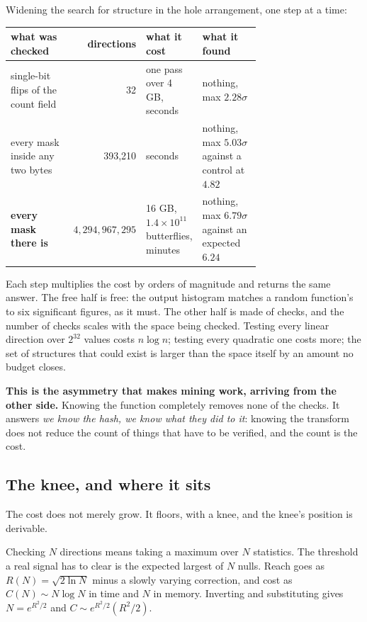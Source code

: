 Widening the search for structure in the hole arrangement, one step at a time:

\begin{center}
\begin{tabular}{@{}p{0.26\linewidth}rp{0.2\linewidth}p{0.24\linewidth}@{}}
\toprule
what was checked & directions & what it cost & what it found \\
\midrule
single-bit flips of the count field & 32 & one pass over 4 GB, seconds & nothing, max \(2.28\sigma\) \\
every mask inside any two bytes & 393,210 & seconds & nothing, max \(5.03\sigma\) against a control at \(4.82\) \\
\textbf{every mask there is} & \(4{,}294{,}967{,}295\) & 16 GB, \(1.4\times10^{11}\) butterflies, minutes & nothing, max \(6.79\sigma\) against an expected \(6.24\) \\
\bottomrule
\end{tabular}
\end{center}

Each step multiplies the cost by orders of magnitude and returns the same answer. The free half is free: the output histogram matches a random function's to six significant figures, as it must. The other half is made of checks, and the number of checks scales with the space being checked. Testing every linear direction over \(2^{32}\) values costs \(n\log n\); testing every quadratic one costs more; the set of structures that could exist is larger than the space itself by an amount no budget closes.

\textbf{This is the asymmetry that makes mining work, arriving from the other side.} Knowing the function completely removes none of the checks. It answers \emph{we know the hash, we know what they did to it}: knowing the transform does not reduce the count of things that have to be verified, and the count is the cost.

\subsection{The knee, and where it sits}

The cost does not merely grow. It floors, with a knee, and the knee's position is derivable.

Checking \(N\) directions means taking a maximum over \(N\) statistics. The threshold a real signal has to clear is the expected largest of \(N\) nulls. Reach goes as \(R(N) = \sqrt{2\ln N}\) minus a slowly varying correction, and cost as \(C(N) \sim N\log N\) in time and \(N\) in memory. Inverting and substituting gives \(N = e^{R^2/2}\) and \(C \sim e^{R^2/2}(R^2/2)\).

